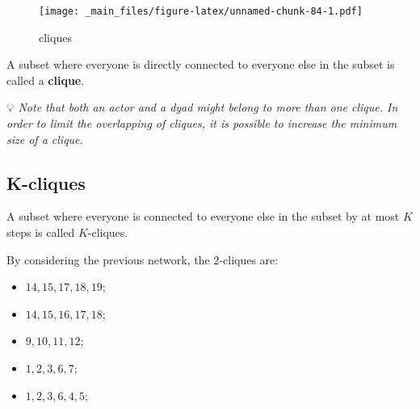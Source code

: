 \documentclass[
  notitlepage,
  onecolumn,
  openany]{book}
\providecommand{\tightlist}{%
  \setlength{\itemsep}{0pt}\setlength{\parskip}{0pt}}
\begin{document}
\begin{figure}
\centering
\texttt{[image: \_main\_files/figure-latex/unnamed-chunk-84-1.pdf]}
\caption{\label{fig:unnamed-chunk-84}cliques}
\end{figure}

A subset where everyone is directly connected to everyone else in the subset is called a \textbf{clique}.

💡 \emph{Note that both an actor and a dyad might belong to more than one clique. In order to limit the overlapping of cliques, it is possible to increase the minimum size of a clique.}

\hypertarget{k-cliques}{%
\subsection{K-cliques}\label{k-cliques}}

A subset where everyone is connected to everyone else in the subset by at most \(K\) steps is called \(K\)-cliques.

By considering the previous network, the \(2\)-cliques are:

\begin{itemize}
\tightlist
\item
  \(14, 15, 17, 18, 19\);
\item
  \(14, 15, 16, 17, 18\);
\item
  \(9, 10, 11, 12\);
\item
  \(1, 2, 3, 6, 7\);
\item
  \(1, 2, 3, 6, 4, 5\);
\end{itemize}
\end{document}
